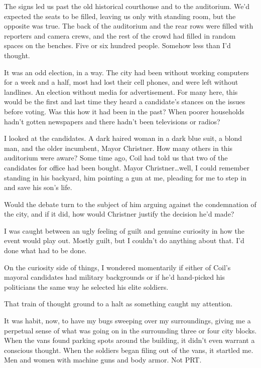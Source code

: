 The signs led us past the old historical courthouse and to the auditorium.  We'd expected the seats to be filled, leaving us only with standing room, but the opposite was true.  The back of the auditorium and the rear rows were filled with reporters and camera crews, and the rest of the crowd had filled in random spaces on the benches.  Five or six hundred people.  Somehow less than I'd thought.



It was an odd election, in a way.  The city had been without working computers for a week and a half, most had lost their cell phones, and were left without landlines.  An election without media for advertisement.  For many here, this would be the first and last time they heard a candidate's stances on the issues before voting.  Was this how it had been in the past?  When poorer households hadn't gotten newspapers and there hadn't been televisions or radios?



I looked at the candidates.  A dark haired woman in a dark blue suit, a blond man, and the older incumbent, Mayor Christner.  How many others in this auditorium were aware?  Some time ago, Coil had told us that two of the candidates for office had been bought.  Mayor Christner\ldots well, I could remember standing in his backyard, him pointing a gun at me, pleading for me to step in and save his son's life.



Would the debate turn to the subject of him arguing against the condemnation of the city, and if it did, how would Christner justify the decision he'd made?



I was caught between an ugly feeling of guilt and genuine curiosity in how the event would play out.  Mostly guilt, but I couldn't do anything about that.  I'd done what had to be done.



On the curiosity side of things, I wondered momentarily if either of Coil's mayoral candidates had military backgrounds or if he'd hand-picked his politicians the same way he selected his elite soldiers.



That train of thought ground to a halt as something caught my attention.



It was habit, now, to have my bugs sweeping over my surroundings, giving me a perpetual sense of what was going on in the surrounding three or four city blocks.  When the vans found parking spots around the building, it didn't even warrant a conscious thought.  When the soldiers began filing out of the vans, it startled me.  Men and women with machine guns and body armor.  Not PRT.



